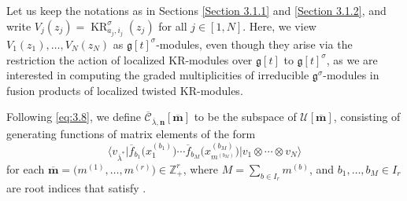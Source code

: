 \documentclass[pdftex]{sigma}
\numberwithin{equation}{section}
\DeclareMathOperator{\KR}{KR}
\begin{document}
Let us keep the notations as in Sections \ref{Section 3.1.1} and \ref{Section 3.1.2}, and write $V_j(z_j)=\KR_{a_j,i_j} ^{\sigma}(z_j)$ for all $j\in [1,N]$. Here, we view $V_1(z_1), \dots,V_N(z_N)$ as $\mathfrak{g}[t]^{\sigma}$-modules, even though they arise via the restriction the action of localized KR-modules over $\mathfrak{g}[t]$ to $\mathfrak{g}[t]^{\sigma}$, as we are interested in computing the graded multiplicities of irreducible $\mathfrak{g}^{\sigma}$-modules in fusion products of localized twisted KR-modules.

Following \eqref{eq:3.8}, we define $\overline{\mathcal{C}}_{\overline{\lambda},\mathbf{n}}[\overline{\mathbf{m}}]$ to be the subspace of $\mathcal{U}[\overline{\mathbf{m}}]$, consisting of generating functions of matrix elements of the form
\begin{equation}
\big\langle v_{\overline{\lambda}^*}\big|\overline{f}_{b_1}\bigl(x_1^{(b_1)}\bigr)\cdots\overline{f}_{b_M}\bigl(x_{m^{(b_M)}}^{(b_M)}\bigr) \big|v_1\otimes\cdots\otimes v_N\big\rangle\label{eq:3.29}
\end{equation}
for each $\overline{\mathbf{m}}=\bigl(m^{(1)},\dots,m^{(r)}\bigr)\in \mathbb{Z}_+^r$, where $M=\sum_{b\in I_r}m^{(b)}$, and $b_1,\dots,b_M\in I_r$ are root indices that satisfy .
\end{document}
